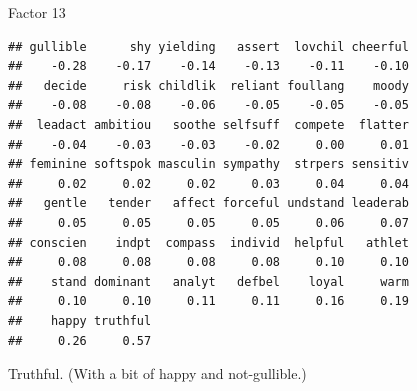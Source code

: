 \begin{frame}[fragile]{Factor 13}
  
  {\small
\begin{knitrout}
\color{fgcolor}\begin{kframe}
\begin{alltt}
\hlstd{mylist[[}\hlstd{]]}
\end{alltt}
\begin{verbatim}
## gullible      shy yielding   assert  lovchil cheerful 
##    -0.28    -0.17    -0.14    -0.13    -0.11    -0.10 
##   decide     risk childlik  reliant foullang    moody 
##    -0.08    -0.08    -0.06    -0.05    -0.05    -0.05 
##  leadact ambitiou   soothe selfsuff  compete  flatter 
##    -0.04    -0.03    -0.03    -0.02     0.00     0.01 
## feminine softspok masculin sympathy  strpers sensitiv 
##     0.02     0.02     0.02     0.03     0.04     0.04 
##   gentle   tender   affect forceful undstand leaderab 
##     0.05     0.05     0.05     0.05     0.06     0.07 
## conscien    indpt  compass  individ  helpful   athlet 
##     0.08     0.08     0.08     0.08     0.10     0.10 
##    stand dominant   analyt   defbel    loyal     warm 
##     0.10     0.10     0.11     0.11     0.16     0.19 
##    happy truthful 
##     0.26     0.57
\end{verbatim}
\end{kframe}
\end{knitrout}
}

Truthful. (With a bit of happy and not-gullible.)

\end{frame}
